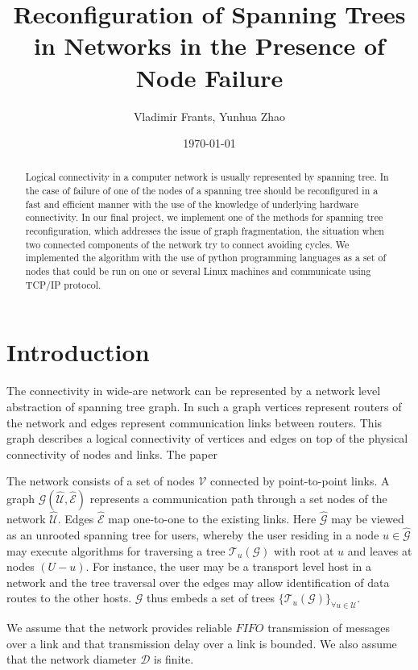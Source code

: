 \documentclass[a4paper,12pt]{article}
\title{Reconfiguration of Spanning Trees in Networks in the Presence of Node Failure}
\author{
  Vladimir Frants,
  Yunhua Zhao
}
\date{\today} %
\newcommand{\<}{\langle}
\renewcommand{\>}{\rangle}
\theoremstyle{definition}
\begin{document}
\maketitle

\begin{abstract} Logical connectivity in a computer network is usually represented by spanning tree. In the case of failure of one of the nodes of a spanning tree should be reconfigured in a fast and efficient manner with the use of the knowledge of underlying hardware connectivity. In our final project, we implement one of the methods for spanning tree reconfiguration, which addresses the issue of graph fragmentation, the situation when two connected components of the network try to connect avoiding cycles. We implemented the algorithm with the use of python programming languages as a set of nodes that could be run on one or several Linux machines and communicate using TCP/IP protocol.  
\end{abstract}

\section{Introduction}

The connectivity in wide-are network can be represented by a network level abstraction of spanning tree graph. In such a graph vertices represent routers of the network and edges represent communication links between routers. This graph describes a logical connectivity of vertices and edges on top of the physical connectivity of nodes and links. The paper 

The network consists of a set of nodes $\mathcal{V}$ connected by point-to-point links. A graph $\mathcal{G}(\hat{\mathcal{U}}, \hat{\mathcal{E}})$ represents a communication path through a set nodes of the network $\hat{\mathcal{U}}$. Edges $\hat{\mathcal{E}}$ map one-to-one to the existing links. Here $\hat{\mathcal{G}}$ may be viewed as an unrooted spanning tree for users, whereby the user residing in a node $u\in\hat{\mathcal{G}}$ may execute algorithms for traversing a tree $\mathcal{T}_{u}(\mathcal{G})$ with root at $u$ and leaves at nodes $(U-u)$. For instance, the user may be a transport level host in a network and the tree traversal over the edges may allow identification of data routes to the other hosts. $\mathcal{G}$ thus embeds a set of trees $\{\mathcal{T}_{u}(\mathcal{G})\}_{\forall u\in\mathcal{U}}$. 

We assume that the network provides reliable $FIFO$ transmission of messages over a link and that transmission delay over a link is bounded. We also assume that the network diameter $\mathcal{D}$ is finite. 
\end{document}

